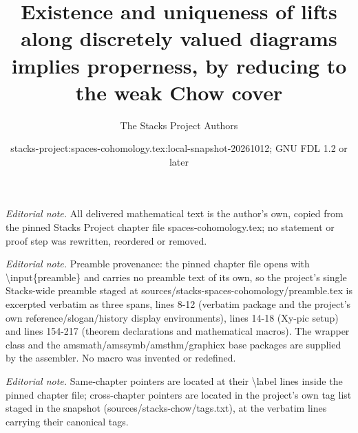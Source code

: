\documentclass[10pt,a4paper]{amsart}
\title{Existence and uniqueness of lifts along discretely valued diagrams implies properness, by reducing to the weak Chow cover}
\author{The Stacks Project Authors}
\date{stacks-project:spaces-cohomology.tex:local-snapshot-20261012; GNU FDL 1.2 or later}
\theoremstyle{plain}
\theoremstyle{definition}
\theoremstyle{remark}
\numberwithin{equation}{subsection}
\begin{document}
\maketitle
\noindent\textit{Editorial note.} All delivered mathematical text is the author's own, copied from the pinned Stacks Project chapter file spaces-cohomology.tex; no statement or proof step was rewritten, reordered or removed.\par\medskip
\noindent\textit{Editorial note.} Preamble provenance: the pinned chapter file opens with \textbackslash{}input\{preamble\} and carries no preamble text of its own, so the project's single Stacks-wide preamble staged at sources/stacks-spaces-cohomology/preamble.tex is excerpted verbatim as three spans, lines 8-12 (verbatim package and the project's own reference/slogan/history display environments), lines 14-18 (Xy-pic setup) and lines 154-217 (theorem declarations and mathematical macros). The wrapper class and the amsmath/amssymb/amsthm/graphicx base packages are supplied by the assembler. No macro was invented or redefined.\par\medskip
\noindent\textit{Editorial note.} Same-chapter pointers are located at their \textbackslash{}label lines inside the pinned chapter file; cross-chapter pointers are located in the project's own tag list staged in the snapshot (sources/stacks-chow/tags.txt), at the verbatim lines carrying their canonical tags.\par\medskip
\end{document}
